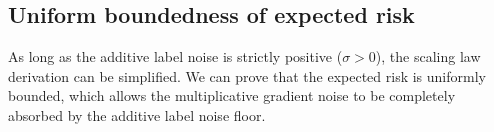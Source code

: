 \documentclass[11pt]{article}
\newcommand{\polyak}{\mathrm{polyak}}
\begin{document}



\subsection{Uniform boundedness of expected risk}
\label{app:pol_uniform_boundedness}

As long as the additive label noise is strictly positive ($\sigma > 0$), the scaling law derivation can be  simplified. We can prove that the expected risk is uniformly bounded, which allows the multiplicative gradient noise to be completely absorbed by the additive label noise floor.
\end{document}
